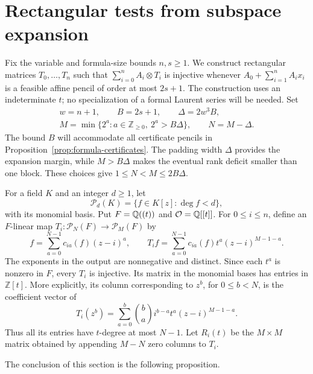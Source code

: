 \section{Rectangular tests from subspace expansion}
\label{sec:expansion}

Fix the variable and formula-size bounds $n,s\geq1$. We construct
rectangular matrices $T_0,\ldots,T_n$ such that
$\sum_{i=0}^n A_i\otimes T_i$ is injective whenever
$A_0+\sum_{i=1}^n A_i x_i$ is a feasible affine pencil of order
at most $2s+1$. The construction uses an indeterminate $t$; no
specialization of a formal Laurent series will be needed. Set
\begin{equation}\label{eq:parameters}
\begin{gathered}
w=n+1,\qquad B=2s+1,\qquad \Delta=2w^3B,\\
M=\min\{2^a:a\in\mathbb Z_{\geq0},\ 2^a>B\Delta\},
\qquad N=M-\Delta.
\end{gathered}
\end{equation}
The bound $B$ will accommodate all certificate pencils in
Proposition~\ref{prop:formula-certificates}. The padding width $\Delta$
provides the expansion margin, while $M>B\Delta$ makes the eventual
rank deficit smaller than one block. These choices give
$1\leq N<M\leq2B\Delta$.

For a field $K$ and an integer $d\geq 1$, let
\[
  \mathcal P_d(K)=\{f\in K[z]:\deg f<d\},
\]
with its monomial basis.  Put $F=\mathbb Q((t))$ and $\mathcal O=\mathbb Q[[t]]$.
For $0\leq i\leq n$, define an $F$-linear map
$T_i\colon\mathcal P_N(F)\longrightarrow\mathcal P_M(F)$ by
\begin{equation}
  f=\sum_{a=0}^{N-1}c_{ia}(f)(z-i)^a,
  \qquad
  T_i f=\sum_{a=0}^{N-1}c_{ia}(f)t^a(z-i)^{M-1-a}.
  \label{eq:rectangular-test}
\end{equation}
The exponents in the output are nonnegative and distinct.  Since each
$t^a$ is nonzero in $F$, every $T_i$ is injective.  Its matrix in the
monomial bases has entries in $\mathbb Z[t]$.  More explicitly, its column
corresponding to $z^b$, for $0\leq b<N$, is the coefficient vector of
\begin{equation}
  T_i(z^b)=\sum_{a=0}^{b}\binom{b}{a}i^{b-a}t^a(z-i)^{M-1-a}.
  \label{eq:test-column}
\end{equation}
Thus all its entries have $t$-degree at most $N-1$.  Let $R_i(t)$ be the
$M\times M$ matrix obtained by appending $M-N$ zero columns to $T_i$.

The conclusion of this section is the following proposition.

